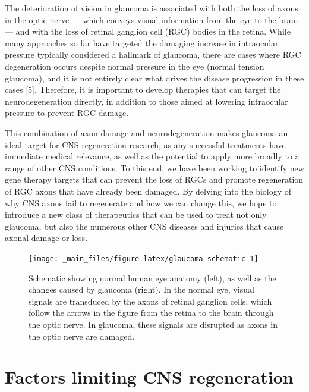 \documentclass[
  12pt,
  a4paper,
]{book}
\begin{document}
The deterioration of vision in glaucoma is associated with both the loss of axons in the optic nerve --- which conveys visual information from the eye to the brain --- and with the loss of retinal ganglion cell (RGC) bodies in the retina. While many approaches so far have targeted the damaging increase in intraocular pressure typically considered a hallmark of glaucoma, there are cases where RGC degeneration occurs despite normal pressure in the eye (normal tension glaucoma), and it is not entirely clear what drives the disease progression in these cases {[}5{]}. Therefore, it is important to develop therapies that can target the neurodegeneration directly, in addition to those aimed at lowering intraocular pressure to prevent RGC damage.

This combination of axon damage and neurodegeneration makes glaucoma an ideal target for CNS regeneration research, as any successful treatments have immediate medical relevance, as well as the potential to apply more broadly to a range of other CNS conditions. To this end, we have been working to identify new gene therapy targets that can prevent the loss of RGCs and promote regeneration of RGC axons that have already been damaged. By delving into the biology of why CNS axons fail to regenerate and how we can change this, we hope to introduce a new class of therapeutics that can be used to treat not only glaucoma, but also the numerous other CNS diseases and injuries that cause axonal damage or loss.

\begin{figure}
\texttt{[image: \_main\_files/figure-latex/glaucoma-schematic-1]} \caption[Glaucoma schematic]{Schematic showing normal human eye anatomy (left), as well as the changes caused by glaucoma (right).  In the normal eye, visual signals are transduced by the axons of retinal ganglion cells, which follow the arrows in the figure from the retina to the brain through the optic nerve.  In glaucoma, these signals are disrupted as axons in the optic nerve are damaged.}\label{fig:glaucoma-schematic}
\end{figure}

\section{Factors limiting CNS regeneration}\label{factors-limiting-cns-regeneration}
\end{document}
